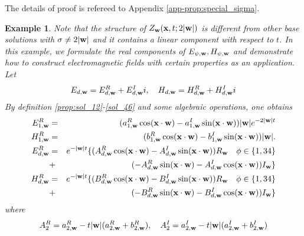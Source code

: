 \documentclass[10pt,reqno]{amsart}
\renewcommand{\(}{\left(}
\renewcommand{\)}{\right)}
\newcommand{\bw}{{\bf w}}
\newcommand{\bx}{\mathbf{x}}
\newtheorem{ex}[theo]{Example}
\numberwithin{equation}{section}
\begin{document}
The details of proof is refereed to Appendix \ref{app-prop:special_sigma}.  
\begin{ex}\label{ex:parallel_field}
Note that the structure of $Z_{\bw}(\bx,t;2|\bw|)$ is different from other base solutions with $\sigma\neq 2|\bw|$ and it contains a linear component with respect to $t$. In this example, we formulate the real components of $E_{\psi,\bw},H_{\psi,\bw}$ and demonstrate how to construct electromagnetic fields with certain properties as an application.  Let
\[
E_{d,\bw} = E^R_{d,\bw} + E^I_{d,\bw}i,\quad H_{d,\bw} = H^R_{d,\bw} + H^I_{d,\bw}i
\]
By definition \ref{prop:sol_12}-\ref{sol_46} and some algebraic operations, one obtains
\begin{eqnarray}
	E^R_{1,\bw} &=& (a^R_{1,\bw} \cos(\bx\cdot \bw) - a^I_{1,\bw} \sin(\bx\cdot \bw))|\bw| e^{-2|\bw|t}   \label{E_real_12}\\
	H^R_{1,\bw} &=& (b^R_{1,\bw} \cos(\bx\cdot \bw)  -  b^I_{1,\bw} \sin(\bx\cdot \bw))  |\bw|. \label{H_real_12} \\
	E^R_{d,\bw}  &=& e^{-|\bw|t} \{(A^R_{d,\bw} \cos(\bx\cdot \bw)  - A^I_{d,\bw} \sin(\bx\cdot \bw))R_{\bw} \quad \phi \in \{1,34\} \nonumber\\ 
	&+&  (-A^R_{d,\bw} \sin(\bx\cdot \bw)  - A^I_{d,\bw} \cos(\bx\cdot \bw))I_{\bw} \} \label{E_real_psi}  \\
	H^R_{d,\bw} &=&  e^{-|\bw|t} \{ (B^R_{d,\bw} \cos(\bx\cdot \bw)  - B^I_{d,\bw} \sin(\bx\cdot \bw))R_{\bw} \quad \phi \in \{1,34\}\nonumber\\
	&+&  (-B^R_{d,\bw} \sin(\bx\cdot \bw)  - B^I_{d,\bw} \cos(\bx\cdot \bw))I_{\bw}\} \label{H_real_psi}
\end{eqnarray}
where
\begin{eqnarray*}
	A^R_{2} = a^R_{2,\bw} - t|\bw|(a^R_{2,\bw} + b^R_{2,\bw}), \quad A^I_{2} = a^I_{2,\bw} - t|\bw|(a^I_{2,\bw} + b^I_{2,\bw})\\

\end{eqnarray*}
\end{ex}
\end{document}
